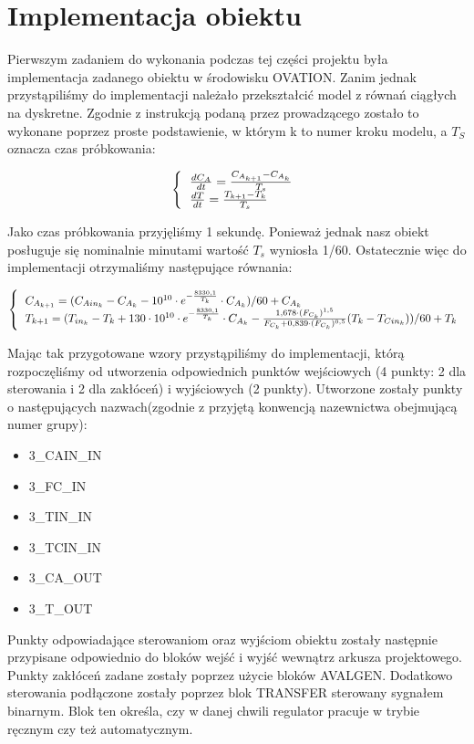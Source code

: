 \chapter{Implementacja obiektu}

Pierwszym zadaniem do wykonania podczas tej części projektu była implementacja zadanego obiektu w środowisku OVATION. Zanim jednak przystąpiliśmy do implementacji należało przekształcić model z równań ciągłych na dyskretne. Zgodnie z instrukcją podaną przez prowadzącego zostało to wykonane poprzez proste podstawienie, w którym k to numer kroku modelu, a $T_S$ oznacza czas próbkowania:

\begin{equation}
\left\{
\begin{tabular}{l}
$\frac{dC_A}{dt} = \frac{C_{A_{k+1}}-C_{A_k}}{T_s}$\\
$\frac{dT}{dt} = \frac{T_{k+1}-T_k}{T_s}$
\end{tabular}
\right.
\end{equation}

Jako czas próbkowania przyjęliśmy 1 sekundę. Ponieważ jednak nasz obiekt posługuje się nominalnie minutami wartość $T_s$ wyniosła 1/60. Ostatecznie więc do implementacji otrzymaliśmy następujące równania:

\begin{equation}
\left\{
\begin{tabular}{l}
$C_{A_{k+1}} = (C_{Ain_k} - C_{A_k} - 10^{10}\cdot e^{-\frac{8330,1}{T_k}}\cdot C_{A_k})/60+C_{A_k}$\\
$T_{k+1} =( T_{in_k} - T_k + 130\cdot 10^{10}\cdot e^{-\frac{8330,1}{T_k}}\cdot C_{A_k}-\frac{1,678\cdot (F_{C_k})^{1,5}}{F_{C_k}+0,839\cdot (F_{C_k})^{0,5}}(T_k-T_{Cin_k}))/60+T_k$
\end{tabular}
\right.
\end{equation}

Mając tak przygotowane wzory przystąpiliśmy do implementacji, którą rozpoczęliśmy od utworzenia odpowiednich punktów wejściowych (4 punkty: 2 dla sterowania i 2 dla zakłóceń) i wyjściowych (2 punkty). Utworzone zostały punkty o następujących nazwach(zgodnie z przyjętą konwencją nazewnictwa obejmującą numer grupy):
\begin{itemize}
	\item 3\_CAIN\_IN
	\item 3\_FC\_IN
	\item 3\_TIN\_IN
	\item 3\_TCIN\_IN
	\item 3\_CA\_OUT
	\item 3\_T\_OUT
\end{itemize}
Punkty odpowiadające sterowaniom oraz wyjściom obiektu zostały następnie przypisane odpowiednio do bloków wejść i wyjść wewnątrz arkusza projektowego. Punkty zakłóceń zadane zostały poprzez użycie bloków AVALGEN. Dodatkowo sterowania podłączone zostały poprzez blok TRANSFER sterowany sygnałem binarnym. Blok ten określa, czy w danej chwili regulator pracuje w trybie ręcznym czy też automatycznym.

